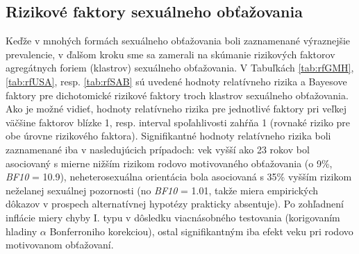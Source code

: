 \documentclass[
]{article}
\begin{document}
\hypertarget{rizikovuxe9-faktory-sexuuxe1lneho-obux165aux17eovania}{%
\subsection{Rizikové faktory sexuálneho obťažovania}\label{rizikovuxe9-faktory-sexuuxe1lneho-obux165aux17eovania}}

Keďže v mnohých formách sexuálneho obťažovania boli zaznamenané výraznejšie prevalencie, v ďalšom kroku sme sa zamerali na skúmanie rizikových faktorov agregátnych foriem (klastrov) sexuálneho obťažovania. V Tabuľkách \ref{tab:rfGMH}, \ref{tab:rfUSA}, resp. \ref{tab:rfSAB} sú uvedené hodnoty relatívneho rizika a Bayesove faktory pre dichotomické rizikové faktory troch klastrov sexuálneho obťažovania. Ako je možné vidieť, hodnoty relatívneho rizika pre jednotlivé faktory pri veľkej väčšine faktorov blízke 1, resp. interval spoľahlivosti zahŕňa 1 (rovnaké riziko pre obe úrovne rizikového faktora). Signifikantné hodnoty relatívneho rizika boli zaznamenané iba v nasledujúcich prípadoch: vek vyšší ako 23 rokov bol asociovaný s mierne nižším rizikom rodovo motivovaného obťažovania (o 9\%, \emph{BF10} = 10.9), neheterosexuálna orientácia bola asociovaná s 35\% vyšším rizikom neželanej sexuálnej pozornosti (no \emph{BF10} = 1.01, takže miera empirických dôkazov v prospech alternatívnej hypotézy prakticky absentuje). Po zohľadnení inflácie miery chyby I. typu v dôsledku viacnásobného testovania (korigovaním hladiny \(\alpha\) Bonferroniho korekciou), ostal signifikantným iba efekt veku pri rodovo motivovanom obťažovaní.
\end{document}
